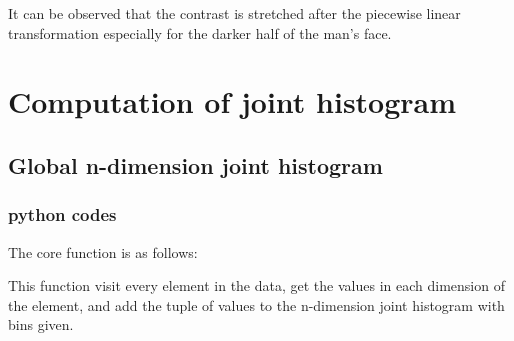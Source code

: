 \documentclass{article}
\begin{document}
It can be observed that the contrast is stretched after the piecewise linear transformation
especially for the darker half of the man's face.




\section{Computation of joint histogram}

\subsection{Global n-dimension joint histogram}
\subsubsection{python codes}
    The core function is as follows:
         
    This function visit every element in the data, get the values in each dimension of the element,
    and add the tuple of values to the n-dimension joint histogram with bins given.
 
\end{document}
